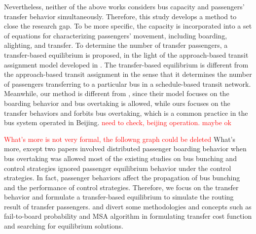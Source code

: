 \documentclass[smallextended]{svjour3}       %
\begin{document}
\begin{Abstract}
Nevertheless, neither of the above works considers bus capacity and passengers' transfer behavior simultaneously. Therefore, this study develops a method to close the research gap. 
To be more specific, the capacity is incorporated into a set of equations for characterizing passengers' movement, including boarding, alighting, and transfer. 
To determine the number of transfer passengers, a transfer-based equilibrium is proposed, in the light of the approach-based transit assignment model developed in \citep{2016Sun,2013Long,2014Szeto,2016Jiang}. 
The transfer-based equilibrium is different from the approach-based transit assignment in the sense that it determines the number of passengers transferring to a particular bus in a schedule-based transit network.
Meanwhile, our method is different from \citep{2016Sun,2017Wu}, since their model focuses on the boarding behavior and bus overtaking is allowed, while ours focuses on the transfer behaviors and forbits bus overtaking, which is a common practice in the bus system operated in Beijing. \textcolor{red}{need to check, beijing operation. maybe ok}

\textcolor{red}{What's more is not very formal, the followng graph could be deleted}
What's more, except two papers involved distributed passenger boarding behavior when bus overtaking was allowed \citep{2016Sun,2017Wu}
most of the existing studies on bus bunching and control strategies ignored passenger equilibrium behavior under the control strategies.
In fact, passenger behaviors affect the propagation of bus bunching and the performance of control strategies.
Therefore, we focus on the transfer behavior and formulate a transfer-based equilibrium to simulate the routing result of transfer passengers.
and divert some methodologies and concepts such as fail-to-board probability and MSA algorithm in formulating transfer cost function and searching for equilibrium solutions.


\end{Abstract}
\end{document}

